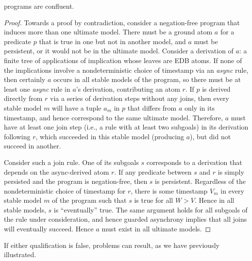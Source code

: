 \begin{theorem}
\label{thm:confluence}
\slang programs are confluent.
\end{theorem}
\begin{proof}

Towards a proof by contradiction, consider a negation-free \lang program that 
induces more than one ultimate model.  There must be a ground atom $a$ for a predicate $p$
that is true in one but
not in another model, and $a$ must be persistent, or it would not be
in the ultimate model.  Consider a derivation of $a$: a finite tree of applications of
implication whose leaves are EDB atoms.  If none of the implications involve a nondeterministic
choice of timestamp via an {\em async} rule, then certainly 
$a$ occurs in all stable models of the program,
so there must be at least one {\em async} rule in $a$'s derivation, contributing an atom
$r$.  
If $p$ is derived directly from 
$r$ via a series of derivation steps without any joins, then every stable
model $m$ will have a tuple $a_m$ in $p$ that differs from $a$ only in its timestamp, 
and hence correspond to the same ultimate model.
Therefore, $a$ must have at least one join step (i.e., a rule with at least two subgoals)
in its derivation following $r$,
which succeeded in this stable model (producing $a$), but did not succeed in another.  

Consider such  a join rule.  One of its subgoals $s$ corresponds to a derivation that depends
on the async-derived atom $r$.  If any predicate between $s$ and $r$ is simply persisted and 
the program is negation-free,
then $s$ is persistent.  Regardless of the nondeterministic choice of timestamp for $r$, there
is some timestamp $V_m$ in every stable model $m$ of the program such that $s$ is true
for all $W > V$.  Hence in all stable models, $s$ is ``eventually'' true.  The same argument holds
for all subgoals of the rule under consideration, and hence guarded asynchrony implies that
all joins will eventually succeed.
Hence $a$ must exist in all ultimate models.
\end{proof}


If either qualification is false, problems can result, as we have previously illustrated.

